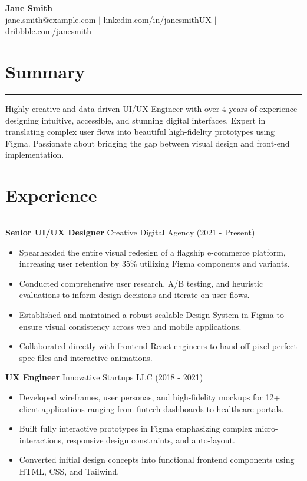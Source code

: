\documentclass[a4paper,10pt]{article}
\begin{document}
\begin{center}
    {\Huge \textbf{Jane Smith}} \\
    \vspace{2mm}
    jane.smith@example.com $|$ linkedin.com/in/janesmithUX $|$ dribbble.com/janesmith
\end{center}

\vspace{5mm}

\section*{Summary}
\hrule
\vspace{2mm}
Highly creative and data-driven UI/UX Engineer with over 4 years of experience designing intuitive, accessible, and stunning digital interfaces. Expert in translating complex user flows into beautiful high-fidelity prototypes using Figma. Passionate about bridging the gap between visual design and front-end implementation.

\section*{Experience}
\hrule
\vspace{2mm}
\noindent \textbf{Senior UI/UX Designer} \hfill Creative Digital Agency (2021 - Present)
\begin{itemize}[leftmargin=*]
    \item Spearheaded the entire visual redesign of a flagship e-commerce platform, increasing user retention by 35\% utilizing Figma components and variants.
    \item Conducted comprehensive user research, A/B testing, and heuristic evaluations to inform design decisions and iterate on user flows.
    \item Established and maintained a robust scalable Design System in Figma to ensure visual consistency across web and mobile applications.
    \item Collaborated directly with frontend React engineers to hand off pixel-perfect spec files and interactive animations.
\end{itemize}

\vspace{3mm}

\noindent \textbf{UX Engineer} \hfill Innovative Startups LLC (2018 - 2021)
\begin{itemize}[leftmargin=*]
    \item Developed wireframes, user personas, and high-fidelity mockups for 12+ client applications ranging from fintech dashboards to healthcare portals.
    \item Built fully interactive prototypes in Figma emphasizing complex micro-interactions, responsive design constraints, and auto-layout.
    \item Converted initial design concepts into functional frontend components using HTML, CSS, and Tailwind.
\end{itemize}
\end{document}
